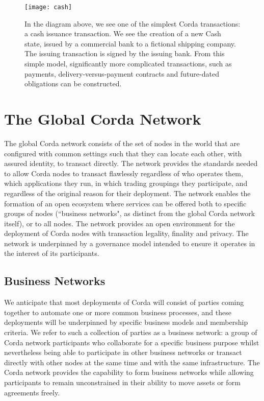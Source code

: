 \documentclass{article}
\begin{document}
\begin{figure}[H]
    \texttt{[image: cash]}
    \caption{In the diagram above, we see one of the simplest Corda transactions: a cash issuance transaction.  We see the creation of a new Cash state, issued by a commercial bank to a fictional shipping company. The issuing transaction is signed by the issuing bank.  From this simple model, significantly more complicated transactions, such as payments, delivery-versus-payment contracts and future-dated obligations can be constructed.}
\end{figure}

\section{The Global Corda Network}
The global Corda network consists of the set of nodes in the world that are configured with common settings such that they can locate each other, with assured identity, to transact directly. The network provides the standards needed to allow Corda nodes to transact flawlessly regardless of who operates them, which applications they run, in which trading groupings they participate, and regardless of the original reason for their deployment. The network enables the formation of an open ecosystem where services can be offered both to specific groups of nodes (``business networks", as distinct from the global Corda network itself), or to all nodes. The network provides an open environment for the deployment of Corda nodes with transaction legality, finality and privacy. The network is underpinned by a governance model intended to ensure it operates in the interest of its participants.

\subsection{Business Networks} \label{businessnetworks}
We anticipate that most deployments of Corda will consist of parties coming together to automate one or more common business processes, and these deployments will be underpinned by specific business models and membership criteria. We refer to such a collection of parties as a business network: a group of Corda network participants who collaborate for a specific business purpose whilst nevertheless being able to participate in other business networks or transact directly with other nodes at the same time and with the same infrastructure. The Corda network provides the capability to form business networks while allowing participants to remain unconstrained in their ability to move assets or form agreements freely.
\end{document}
